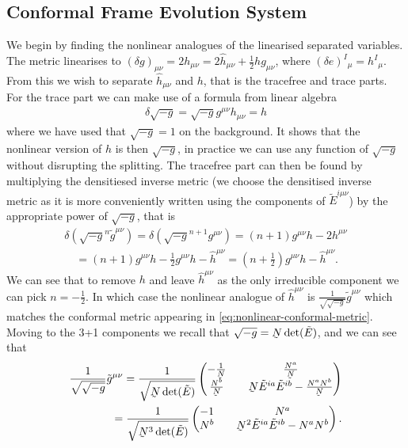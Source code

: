 \documentclass[10pt]{report}
\newcommand{\utilde}[1]{\underaccent{\tilde}{#1}}
\theoremstyle{definition}
\newcommand{\tE}[0]{\tilde{E}}
\newcommand{\tg}[0]{\tilde{g}}
\newcommand{\dlap}[0]{\utilde{N}}
\begin{document}
    \subsection{Conformal Frame Evolution System}
    We begin by finding the nonlinear analogues of the linearised separated variables. The metric linearises to $(\delta g)_{\mu\nu} = 2 h_{\mu\nu} = 2 \hat{h}_{\mu\nu} + \frac{1}{2} h g_{\mu\nu}$, where $(\delta e)^I{}_\mu = h^I{}_\mu$. From this we wish to separate $\hat{h}_{\mu\nu}$ and $h$, that is the tracefree and trace parts. For the trace part we can make use of a formula from linear algebra
    \begin{align}
        \delta \sqrt{-g} = \sqrt{-g} g^{\mu\nu} h_{\mu\nu} = h
    \end{align}
    where we have used that $\sqrt{-g}=1$ on the background. It shows that the nonlinear version of $h$ is then $\sqrt{-g}$, in practice we can use any function of $\sqrt{-g}$ without disrupting the splitting. The tracefree part can then be found by multiplying the densitiesed inverse metric (we choose the densitised inverse metric as it is more conveniently written using the components of $\tE^{i\mu\nu}$) by the appropriate power of $\sqrt{-g}$, that is
    \begin{align}
        \delta( \sqrt{-g}^n \tg^{\mu\nu} ) = \delta( \sqrt{-g}^{n+1} g^{\mu\nu} ) = (n+1) g^{\mu\nu} h - 2 h^{\mu\nu} \nonumber \\ \quad = (n+1) g^{\mu\nu} h - \frac{1}{2} g^{\mu\nu} h - \hat{h}^{\mu\nu} = \left( n + \frac{1}{2} \right) g^{\mu\nu} h - \hat{h}^{\mu\nu}.
    \end{align}
    We can see that to remove $h$ and leave $\hat{h}^{\mu\nu}$ as the only irreducible component we can pick $n = -\frac{1}{2}$. In which case the nonlinear analogue of $\hat{h}^{\mu\nu}$ is $\frac{1}{\sqrt{\sqrt{-g}}} \tg^{\mu\nu}$ which matches the conformal metric appearing in \cref{eq:nonlinear-conformal-metric}. Moving to the 3+1 components we recall that $\sqrt{-g} = \dlap \det(\tE)$, and we can see that 
    \begin{align}
        \frac{1}{\sqrt{\sqrt{-g}}} \tg^{\mu\nu} = \frac{1}{\sqrt{\dlap \det(\tE)}} \begin{pmatrix}
            -\frac{1}{\dlap} && \frac{N^a}{\dlap} \\ \frac{N^b}{\dlap} && \dlap \tE^{ia} \tE^{ib} - \frac{N^a N^b}{\dlap}
        \end{pmatrix} \nonumber \\ = \frac{1}{\sqrt{\dlap^3 \det(\tE) }} \begin{pmatrix}
            -1 && N^a \\ N^b && \dlap^2 \tE^{ia} \tE^{ib} - N^a N^b
        \end{pmatrix}.
    \end{align}
\end{document}
